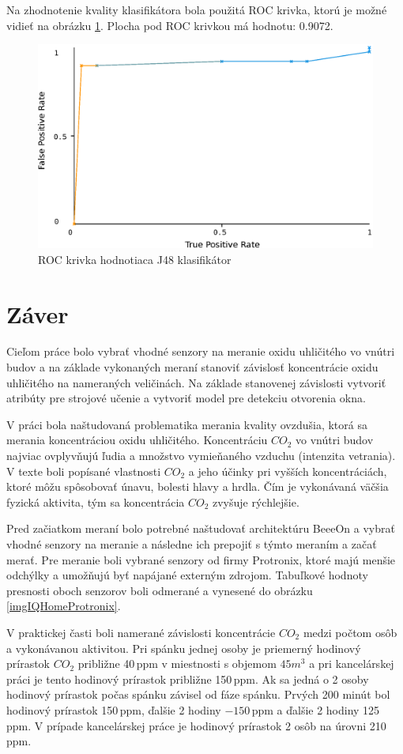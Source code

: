 \noindent Na zhodnotenie kvality klasifikátora bola použitá ROC krivka, ktorú je možné vidieť na obrázku \ref{imgRocKrivka}. Plocha pod ROC krivkou má hodnotu: 0.9072.

\begin{figure}[H]
	\centering
	\includegraphics[width=320pt]{images/roc.eps} 
	\caption{ROC krivka hodnotiaca J48 klasifikátor}
	\label{imgRocKrivka}
\end{figure}

\chapter{Záver}
Cieľom práce bolo vybrať vhodné senzory na meranie oxidu uhličitého vo vnútri budov a na základe vykonaných meraní stanoviť závislosť koncentrácie oxidu uhličitého na nameraných veličinách. Na základe stanovenej závislosti vytvoriť atribúty pre strojové učenie a vytvoriť model pre detekciu otvorenia okna.

V práci bola naštudovaná problematika merania kvality ovzdušia, ktorá sa merania koncentráciou oxidu uhličitého. Koncentráciu $CO_2$ vo vnútri budov najviac ovplyvňujú ľudia a množstvo vymieňaného vzduchu (intenzita vetrania). V texte boli popísané vlastnosti $CO_2$ a jeho účinky pri vyšších koncentráciách, ktoré môžu spôsobovať únavu, bolesti hlavy a hrdla. Čím je vykonávaná väčšia fyzická aktivita, tým sa koncentrácia $CO_2$ zvyšuje rýchlejšie.

Pred začiatkom meraní bolo potrebné naštudovať architektúru BeeeOn a vybrať vhodné senzory na meranie a následne ich prepojiť s týmto meraním a začať merať. Pre meranie boli vybrané senzory od firmy Protronix, ktoré majú menšie odchýlky a umožňujú byť napájané externým zdrojom. Tabuľkové hodnoty presnosti oboch senzorov boli odmerané a vynesené do obrázku \ref{imgIQHomeProtronix}.

V praktickej časti boli namerané závislosti koncentrácie $CO_2$ medzi počtom osôb a vykonávanou aktivitou. Pri spánku jednej osoby je priemerný hodinový prírastok $CO_2$ približne 40\,ppm v miestnosti s objemom $45m^3$ a pri kancelárskej práci je tento hodinový prírastok približne 150\,ppm. Ak sa jedná o 2 osoby hodinový prírastok počas spánku závisel od fáze spánku. Prvých 200 minút bol hodinový prírastok 150\,ppm, ďalšie 2 hodiny $-150$\,ppm a ďalšie 2 hodiny 125\,ppm. V prípade kancelárskej práce je hodinový prírastok 2 osôb na úrovni 210\,ppm.


